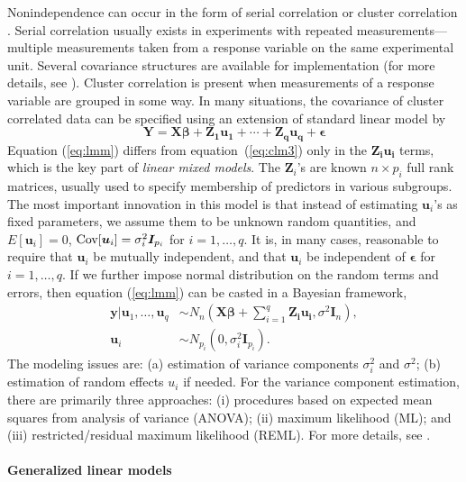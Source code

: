 Nonindependence can occur in the form of serial correlation or cluster correlation
\citep[chapter~17]{rencher2008linear}. Serial correlation usually exists in experiments with
repeated measurements---multiple measurements taken from a response variable on the same
experimental unit. Several covariance structures are available for implementation (for more details,
see \citet[chapter~5]{littell2006sas}).  Cluster correlation is present when measurements of a
response variable are grouped in some way. In many situations, the covariance of cluster correlated
data can be specified using an extension of standard linear model by 
\begin{equation}\label{eq:lmm}
	\bm Y = \bm {X\beta} + \bm {Z_1u_1}+\cdots + \bm {Z_qu_q} + \bm \epsilon	
\end{equation}
Equation (\ref{eq:lmm}) differs from equation~(\ref{eq:clm3}) only in the $\bm {Z_iu_i}$ terms,
which is the key part of \textit{linear mixed models}.  The $\bm Z_i$'s are known $n\times p_i$ full
rank matrices, usually used to specify membership of predictors in various subgroups. The most
important innovation in this model is that instead of estimating $\bm u_i$'s as fixed parameters, we
assume them to be unknown random quantities, and $E[\bm u_i]=0$, $\text{Cov}[\bm u_i]= \sigma_i^2 \bm
I_{p_i}$ for $i=1, \ldots, q$. It is, in many cases, reasonable to require that $\bm u_i$ be
mutually independent, and that $\bm u_i$ be independent of $\bm \epsilon$ for $i=1, \ldots, q$. If
we further impose normal distribution on the random terms and errors, then equation (\ref{eq:lmm})
can be casted in a Bayesian framework,
\begin{equation}\label{eq:lmmGuass}
	\begin{split}
		\bm y|\bm u_1, \ldots, \bm u_q   & \sim  N_n(\bm {X\beta} + \sum_{i=1}^q \bm {Z_iu_i}, \sigma^2\bm
		I_n),  \\
		\bm u_i &\sim N_{p_i}(0, \sigma_i^2 \bm I_{p_i}).
	\end{split}
\end{equation}
The modeling issues are: (a) estimation of variance components $\sigma_i^2$ and $\sigma^2$; (b)
estimation of random effects $u_i$ if needed. For the variance component estimation, there are
primarily three approaches: (i) procedures based on expected mean squares from analysis of variance
(ANOVA); (ii) maximum likelihood (ML); and (iii) restricted/residual maximum likelihood (REML). For
more details, see \citet[Chapter 1]{littell2006sas}.


\paragraph{Generalized linear models}\label{para:glm}

